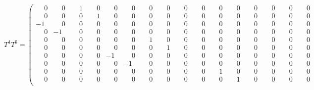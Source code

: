 \documentclass[10pt]{article}
\begin{document}
\[
T^{4}T^{6} = \left(\begin{smallmatrix}
\phantom{-}0 & \phantom{-}0 & \phantom{-}1 & \phantom{-}0 & \phantom{-}0 & \phantom{-}0 & \phantom{-}0 & \phantom{-}0 & \phantom{-}0 & \phantom{-}0 & \phantom{-}0 & \phantom{-}0 & \phantom{-}0 & \phantom{-}0 & \phantom{-}0 & \phantom{-}0 \\
\phantom{-}0 & \phantom{-}0 & \phantom{-}0 & \phantom{-}1 & \phantom{-}0 & \phantom{-}0 & \phantom{-}0 & \phantom{-}0 & \phantom{-}0 & \phantom{-}0 & \phantom{-}0 & \phantom{-}0 & \phantom{-}0 & \phantom{-}0 & \phantom{-}0 & \phantom{-}0 \\
-1 & \phantom{-}0 & \phantom{-}0 & \phantom{-}0 & \phantom{-}0 & \phantom{-}0 & \phantom{-}0 & \phantom{-}0 & \phantom{-}0 & \phantom{-}0 & \phantom{-}0 & \phantom{-}0 & \phantom{-}0 & \phantom{-}0 & \phantom{-}0 & \phantom{-}0 \\
\phantom{-}0 & -1 & \phantom{-}0 & \phantom{-}0 & \phantom{-}0 & \phantom{-}0 & \phantom{-}0 & \phantom{-}0 & \phantom{-}0 & \phantom{-}0 & \phantom{-}0 & \phantom{-}0 & \phantom{-}0 & \phantom{-}0 & \phantom{-}0 & \phantom{-}0 \\
\phantom{-}0 & \phantom{-}0 & \phantom{-}0 & \phantom{-}0 & \phantom{-}0 & \phantom{-}0 & \phantom{-}1 & \phantom{-}0 & \phantom{-}0 & \phantom{-}0 & \phantom{-}0 & \phantom{-}0 & \phantom{-}0 & \phantom{-}0 & \phantom{-}0 & \phantom{-}0 \\
\phantom{-}0 & \phantom{-}0 & \phantom{-}0 & \phantom{-}0 & \phantom{-}0 & \phantom{-}0 & \phantom{-}0 & \phantom{-}1 & \phantom{-}0 & \phantom{-}0 & \phantom{-}0 & \phantom{-}0 & \phantom{-}0 & \phantom{-}0 & \phantom{-}0 & \phantom{-}0 \\
\phantom{-}0 & \phantom{-}0 & \phantom{-}0 & \phantom{-}0 & -1 & \phantom{-}0 & \phantom{-}0 & \phantom{-}0 & \phantom{-}0 & \phantom{-}0 & \phantom{-}0 & \phantom{-}0 & \phantom{-}0 & \phantom{-}0 & \phantom{-}0 & \phantom{-}0 \\
\phantom{-}0 & \phantom{-}0 & \phantom{-}0 & \phantom{-}0 & \phantom{-}0 & -1 & \phantom{-}0 & \phantom{-}0 & \phantom{-}0 & \phantom{-}0 & \phantom{-}0 & \phantom{-}0 & \phantom{-}0 & \phantom{-}0 & \phantom{-}0 & \phantom{-}0 \\
\phantom{-}0 & \phantom{-}0 & \phantom{-}0 & \phantom{-}0 & \phantom{-}0 & \phantom{-}0 & \phantom{-}0 & \phantom{-}0 & \phantom{-}0 & \phantom{-}0 & \phantom{-}1 & \phantom{-}0 & \phantom{-}0 & \phantom{-}0 & \phantom{-}0 & \phantom{-}0 \\
\phantom{-}0 & \phantom{-}0 & \phantom{-}0 & \phantom{-}0 & \phantom{-}0 & \phantom{-}0 & \phantom{-}0 & \phantom{-}0 & \phantom{-}0 & \phantom{-}0 & \phantom{-}0 & \phantom{-}1 & \phantom{-}0 & \phantom{-}0 & \phantom{-}0 & \phantom{-}0 \\

\end{smallmatrix}\]
\end{document}
